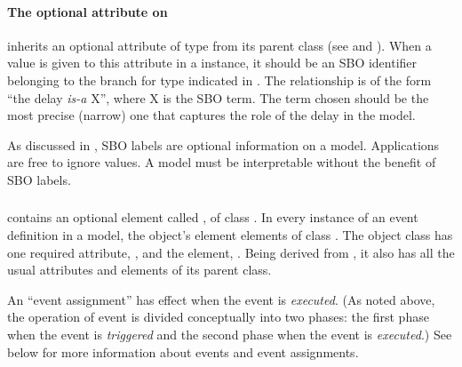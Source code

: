

\paragraph{The optional  attribute on }
\label{sec:delay-sboterm}

\Delay inherits an optional  attribute of type
 from its parent class \SBase (see
 and ).  When a
value is given to this attribute in a \Delay instance, it should
be an SBO identifier belonging to the branch for type \Delay
indicated in .  The
relationship is of the form ``the delay \emph{is-a} X'', where X
is the SBO term.  The term chosen should be the most precise
(narrow) one that captures the role of the delay in the model.

As discussed in , SBO labels are optional
information on a model.  Applications are free to ignore
 values.  A model must be interpretable without the
benefit of SBO labels.


\subsubsection{}
\label{sec:eventassignment}
\label{sec:listofeventassignments}

\Event contains an optional element called
, of class \ListOfEventAssignments.
In every instance of an event definition in a model, the object's
 element   elements of class
\EventAssignment.  The object class \EventAssignment has one
required attribute, , and the element,
.  Being derived from \SBase, it also has all the
usual attributes and elements of its parent class.

An ``event assignment'' has effect when the event is
\emph{executed}.  (As noted above, the operation of event is
divided conceptually into two phases: the first phase when the
event is \emph{triggered} and the second phase when the event is
\emph{executed}.)  See  below for
more information about events and event assignments.


